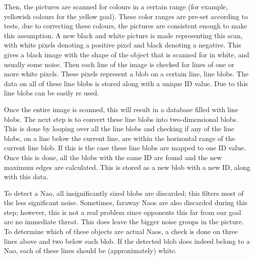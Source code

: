 \documentclass[a4paper]{article}
\begin{document}
Then, the pictures are scanned for colours in a certain range (for example, yellowish colours for the yellow goal). These color ranges are pre-set according to tests, due to correcting these colours, the pictures are consistent enough to make this assumption. A new black and white picture is made representing this scan, with white pixels denoting a positive pixel and black denoting a negative. This gives a black image with the shape of the object that is scanned for in white, and usually some noise. Then each line of the image is checked for lines of one or more white pixels. These pixels represent a blob on a certain line, line blobs. The data on all of these line blobs is stored along with a unique ID value. Due to this line blobs can be easily re used.

Once the entire image is scanned, this will result in a database filled with line blobs. The next step is to convert these line blobs into two-dimensional blobs. This is done by looping over all the line blobs and checking if any of the line blobs, on a line below the current line, are within the horizontal range of the current line blob. If this is the case these line blobs are mapped to one ID value. Once this is done, all the blobs with the same ID are found and the new maximum edges are calculated. This is stored as a new blob with a new ID, along with this data.

To detect a Nao, all insignificantly sized blobs are discarded; this filters most of the less significant noise. Sometimes, faraway Naos are also discarded during this step; however, this is not a real problem since opponents this far from our goal are no immediate threat. This does leave the bigger noise groups in the picture. To determine which of these objects are actual Naos, a check is done on three lines above and two below each blob. If the detected blob does indeed belong to a Nao, each of these lines should be (approximately) white.
\end{document}
